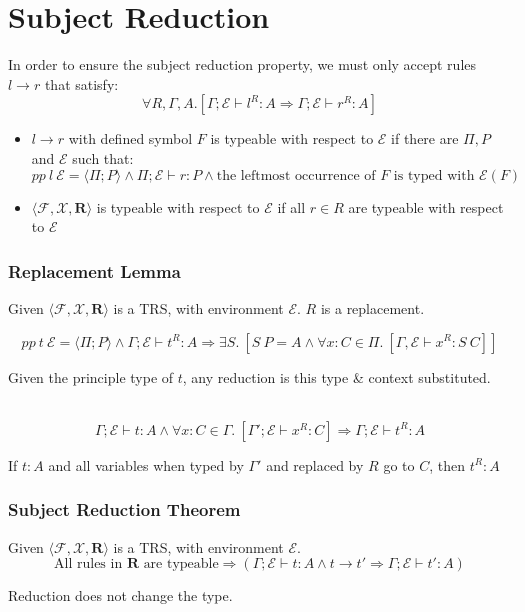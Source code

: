 \section{Subject Reduction}
In order to ensure the subject reduction property, we must only accept rules $l \to r$ that satisfy:
\[\forall R, \Gamma, A . [\Gamma;\mathcal{E} \vdash l^R : A \Rightarrow \Gamma;\mathcal{E} \vdash r^R : A]\]

\begin{itemize}
	\item {$l \to r$ with defined symbol $F$ is typeable with respect to $\mathcal{E}$ if there are $\Pi, P$ and $\mathcal{E}$ such that:
	      \[pp \ l \ \mathcal{E} = \langle \Pi ; P \rangle \land \Pi; \mathcal{E} \vdash r : P \land \text{the leftmost occurrence of }F\text{ is typed with }\mathcal{E}(F) \]
	      }
	\item $\langle \mathcal{F}, \mathcal{X}, \mathbf{R} \rangle$ is typeable with respect to $\mathcal{E}$ if all $r \in R$ are typeable with respect to $\mathcal{E}$
\end{itemize}

\subsubsection{Replacement Lemma}
Given $\langle \mathcal{F}, \mathcal{X}, \mathbf{R} \rangle$ is a TRS, with environment $\mathcal{E}$. $R$ is a replacement.

\[pp \ t \ \mathcal{E} = \langle \Pi ; P \rangle \land \Gamma; \mathcal{E} \vdash t^R : A \Rightarrow \exists S . \ [S \ P = A \land \forall x:C \in \Pi . \ [\Gamma, \mathcal{E} \vdash x^R : S \ C]]\]
\centerline{Given the principle type of $t$, any reduction is this type \& context substituted.}
\\
\[\Gamma ; \mathcal{E} \vdash t : A \land \forall x:C \in \Gamma . \ [\Gamma';\mathcal{E} \vdash x^R : C] \Rightarrow \Gamma;\mathcal{E} \vdash t^R : A\]
\centerline{If $t : A$ and all variables when typed by $\Gamma'$ and replaced by $R$ go to $C$, then $t^R : A$}

\subsubsection{Subject Reduction Theorem}
Given $\langle \mathcal{F}, \mathcal{X}, \mathbf{R} \rangle$ is a TRS, with environment $\mathcal{E}$.
\[\text{All rules in $\mathbf{R}$ are typeable} \Rightarrow (\Gamma; \mathcal{E} \vdash t : A \land t \to t' \Rightarrow \Gamma;\mathcal{E} \vdash t' : A)\]
\centerline{Reduction does not change the type.}


